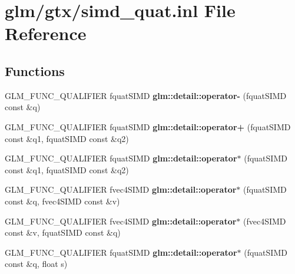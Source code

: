 \hypertarget{simd__quat_8inl}{\section{glm/gtx/simd\-\_\-quat.inl File Reference}
\label{simd__quat_8inl}
}
\subsection*{Functions}
\begin{DoxyCompactItemize}
\item 
\hypertarget{namespaceglm_1_1detail_a07dbb5e436fcb64a3c165a15c920a484}{G\-L\-M\-\_\-\-F\-U\-N\-C\-\_\-\-Q\-U\-A\-L\-I\-F\-I\-E\-R fquat\-S\-I\-M\-D {\bfseries glm\-::detail\-::operator-\/} (fquat\-S\-I\-M\-D const \&q)}\label{namespaceglm_1_1detail_a07dbb5e436fcb64a3c165a15c920a484}

\item 
\hypertarget{namespaceglm_1_1detail_a0010f5683721f2724e0e00709fc51405}{G\-L\-M\-\_\-\-F\-U\-N\-C\-\_\-\-Q\-U\-A\-L\-I\-F\-I\-E\-R fquat\-S\-I\-M\-D {\bfseries glm\-::detail\-::operator+} (fquat\-S\-I\-M\-D const \&q1, fquat\-S\-I\-M\-D const \&q2)}\label{namespaceglm_1_1detail_a0010f5683721f2724e0e00709fc51405}

\item 
\hypertarget{namespaceglm_1_1detail_a6e7c8ca42117ec6c0c60b765f083557b}{G\-L\-M\-\_\-\-F\-U\-N\-C\-\_\-\-Q\-U\-A\-L\-I\-F\-I\-E\-R fquat\-S\-I\-M\-D {\bfseries glm\-::detail\-::operator$\ast$} (fquat\-S\-I\-M\-D const \&q1, fquat\-S\-I\-M\-D const \&q2)}\label{namespaceglm_1_1detail_a6e7c8ca42117ec6c0c60b765f083557b}

\item 
\hypertarget{namespaceglm_1_1detail_af198c6bb57f5b38b3fd5961b8d9b352e}{G\-L\-M\-\_\-\-F\-U\-N\-C\-\_\-\-Q\-U\-A\-L\-I\-F\-I\-E\-R fvec4\-S\-I\-M\-D {\bfseries glm\-::detail\-::operator$\ast$} (fquat\-S\-I\-M\-D const \&q, fvec4\-S\-I\-M\-D const \&v)}\label{namespaceglm_1_1detail_af198c6bb57f5b38b3fd5961b8d9b352e}

\item 
\hypertarget{namespaceglm_1_1detail_a8da00ab5a90294ba3a8c7ebcb20a8bed}{G\-L\-M\-\_\-\-F\-U\-N\-C\-\_\-\-Q\-U\-A\-L\-I\-F\-I\-E\-R fvec4\-S\-I\-M\-D {\bfseries glm\-::detail\-::operator$\ast$} (fvec4\-S\-I\-M\-D const \&v, fquat\-S\-I\-M\-D const \&q)}\label{namespaceglm_1_1detail_a8da00ab5a90294ba3a8c7ebcb20a8bed}

\item 
\hypertarget{namespaceglm_1_1detail_a828cc0ad293110da78ec58305e89ac3a}{G\-L\-M\-\_\-\-F\-U\-N\-C\-\_\-\-Q\-U\-A\-L\-I\-F\-I\-E\-R fquat\-S\-I\-M\-D {\bfseries glm\-::detail\-::operator$\ast$} (fquat\-S\-I\-M\-D const \&q, float s)}\label{namespaceglm_1_1detail_a828cc0ad293110da78ec58305e89ac3a}


\end{DoxyCompactItemize}
